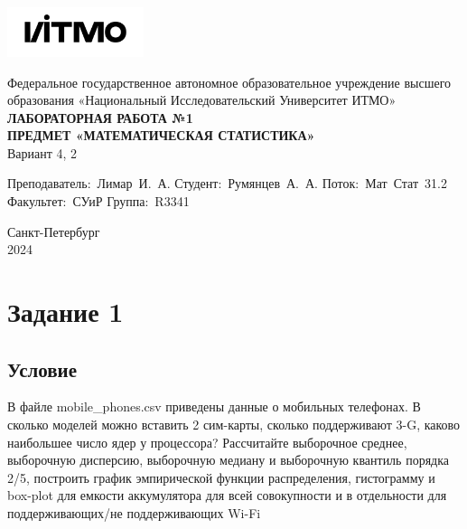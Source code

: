 \documentclass[a4paper, 12pt]{article}
\begin{document}
    \begin{titlepage}

        \begin{center}
        \includegraphics[width=0.3\textwidth]{itmo.png} %
        \vfill
        
        Федеральное государственное автономное образовательное учреждение высшего образования
        «Национальный Исследовательский Университет ИТМО»\\
        
        \vfill
        {\large\bf ЛАБОРАТОРНАЯ РАБОТА №1}\\
        {\large\bf ПРЕДМЕТ «МАТЕМАТИЧЕСКАЯ СТАТИСТИКА»}\\
        Вариант 4, 2
        \vfill

        \begin{flushright}
            \begin{minipage}{.45\textwidth}
            {
                \hbox{Преподаватель: Лимар И. А.}
                \hbox{Студент: Румянцев А. А.}
                \hbox{Поток: Мат Стат 31.2}
                \hbox{}
                \hbox{Факультет: СУиР}
                \hbox{Группа: R3341}
            }
            \end{minipage}
        \end{flushright}
        
        \vfill
                
        Санкт-Петербург\\
        2024
        \end{center}
    \end{titlepage}
    
    \tableofcontents

    \newpage
    \section{Задание 1}
    \subsection{Условие}
    В файле mobile\_{phones}.csv приведены данные о мобильных телефонах. В сколько моделей
    можно вставить 2 сим-карты, сколько поддерживают 3-G, каково наибольшее число ядер
    у процессора? Рассчитайте выборочное среднее, выборочную дисперсию, выборочную медиану
    и выборочную квантиль порядка 2/5, построить график эмпирической функции
    распределения, гистограмму и box-plot для емкости аккумулятора для всей совокупности
    и в отдельности для поддерживающих/не поддерживающих Wi-Fi
\end{document}
